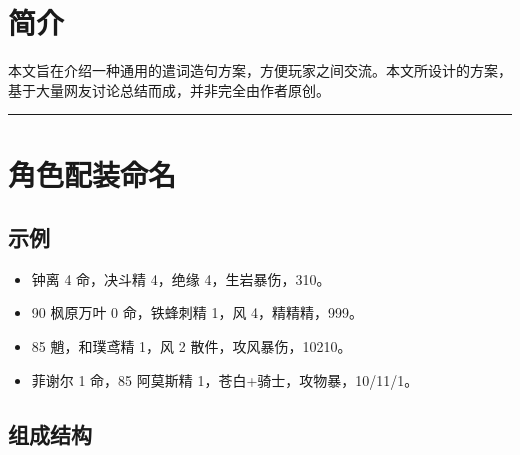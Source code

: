 
\uselangzh

\usepackage{datetime2}
\usepackage{longtable}
\usepackage{tabu}
\usepackage{tasks}

\setlength{\tabulinesep}{5pt}




\section*{简介}

本文旨在介绍一种通用的遣词造句方案，方便玩家之间交流。本文所设计的方案，基于大量网友讨论总结而成，并非完全由作者原创。

\maketoc{}{}

\vspace{2em}
\hrule

\section{角色配装命名}

\subsection{示例}

\begin{itemize}
	\item 钟离 4 命，决斗精 4，绝缘 4，生岩暴伤，310。
	\item 90 枫原万叶 0 命，铁蜂刺精 1，风 4，精精精，999。
	\item 85 魈，和璞鸢精 1，风 2 散件，攻风暴伤，10210。
	\item 菲谢尔 1 命，85 阿莫斯精 1，苍白+骑士，攻物暴，10/11/1。
\end{itemize}

\subsection{组成结构}

